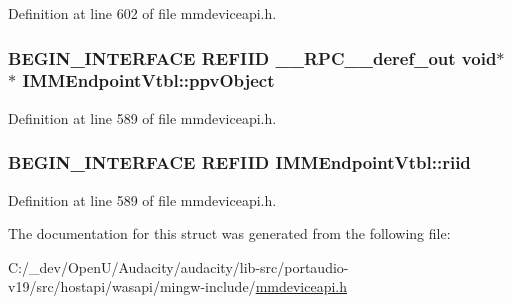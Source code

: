 Definition at line 602 of file mmdeviceapi.\+h.

\subsubsection[{\texorpdfstring{ppv\+Object}{ppvObject}}]{\setlength{\rightskip}{0pt plus 5cm}B\+E\+G\+I\+N\+\_\+\+I\+N\+T\+E\+R\+F\+A\+CE {\bf R\+E\+F\+I\+ID} {\bf \+\_\+\+\_\+\+R\+P\+C\+\_\+\+\_\+deref\+\_\+out} {\bf void}$\ast$$\ast$ I\+M\+M\+Endpoint\+Vtbl\+::ppv\+Object}\hypertarget{struct_i_m_m_endpoint_vtbl_a6bada0d8ac9a49cfef25c84e92df4b57}{}\label{struct_i_m_m_endpoint_vtbl_a6bada0d8ac9a49cfef25c84e92df4b57}


Definition at line 589 of file mmdeviceapi.\+h.

\subsubsection[{\texorpdfstring{riid}{riid}}]{\setlength{\rightskip}{0pt plus 5cm}B\+E\+G\+I\+N\+\_\+\+I\+N\+T\+E\+R\+F\+A\+CE {\bf R\+E\+F\+I\+ID} I\+M\+M\+Endpoint\+Vtbl\+::riid}\hypertarget{struct_i_m_m_endpoint_vtbl_a3eea108bf7193a030103beee6b01aaa7}{}\label{struct_i_m_m_endpoint_vtbl_a3eea108bf7193a030103beee6b01aaa7}


Definition at line 589 of file mmdeviceapi.\+h.



The documentation for this struct was generated from the following file\+:\begin{DoxyCompactItemize}
\item 
C\+:/\+\_\+dev/\+Open\+U/\+Audacity/audacity/lib-\/src/portaudio-\/v19/src/hostapi/wasapi/mingw-\/include/\hyperlink{mmdeviceapi_8h}{mmdeviceapi.\+h}\end{DoxyCompactItemize}
